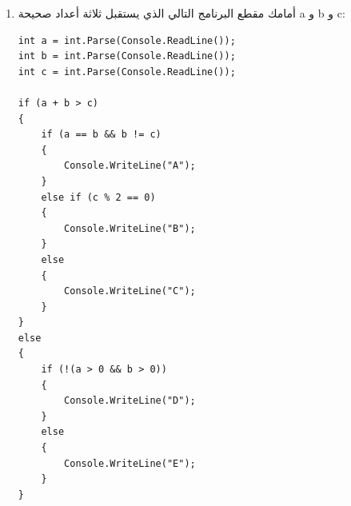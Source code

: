 \documentclass[14pt]{extarticle}
\begin{document}
\begin{enumerate}[itemsep=2.2em]
\begin{boxSolution}
\textbf{حل الفرع ب (أمثلة لإجابات صحيحة):}
\begin{itemize}[nosep]
    \item لطباعة \textenglish{A}: يجب أن يكون \textenglish{a > b} وكلاهما زوجي، مثل: \textenglish{62} أو \textenglish{64} أو \textenglish{82}.
    \item لطباعة \textenglish{B} مع كون \textenglish{a} زوجيًا: يجب أن يكون \textenglish{a > b} و \textenglish{b} فرديًا، مثل: \textenglish{63} أو \textenglish{85} أو \textenglish{41}.
    \item لطباعة \textenglish{C} مع تساوي المنزلتين: مثل \textenglish{44} أو \textenglish{77}.
    \item لطباعة \textenglish{C} مع اختلاف المنزلتين: يجب أن يكون \textenglish{b - a > 4}، مثل \textenglish{17} أو \textenglish{39}.
    \item لطباعة \textenglish{D}: يجب أن يكون \textenglish{a < b} والفرق بينهما $4$ أو أقل، مثل \textenglish{25} أو \textenglish{47}.
\end{itemize}
\end{boxSolution}
\fi
\filbreak

\item
أمامك مقطع البرنامج التالي الذي يستقبل ثلاثة أعداد صحيحة \textenglish{a} و \textenglish{b} و \textenglish{c}:

\begin{boxCode}
\begin{english}
\begin{verbatim}
int a = int.Parse(Console.ReadLine());
int b = int.Parse(Console.ReadLine());
int c = int.Parse(Console.ReadLine());

if (a + b > c)
{
    if (a == b && b != c)
    {
        Console.WriteLine("A");
    }
    else if (c % 2 == 0)
    {
        Console.WriteLine("B");
    }
    else
    {
        Console.WriteLine("C");
    }
}
else
{
    if (!(a > 0 && b > 0))
    {
        Console.WriteLine("D");
    }
    else
    {
        Console.WriteLine("E");
    }
}
\end{verbatim}
\end{english}
\end{boxCode}


\end{enumerate}
\end{document}
